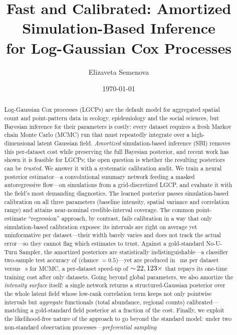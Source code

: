 \documentclass[11pt]{article}
\title{\bfseries Fast and Calibrated: Amortized Simulation-Based Inference\\
for Log-Gaussian Cox Processes}
\author[ ]{Elizaveta Semenova}
\affil[ ]{\small Department of Epidemiology and Biostatistics, Imperial College London}
\date{\today}
\begin{document}
\maketitle

\begin{abstract}
\noindent
Log-Gaussian Cox processes (LGCPs) are the default model for aggregated spatial
count and point-pattern data in ecology, epidemiology and the social sciences,
but Bayesian inference for their parameters is costly: every dataset requires a
fresh Markov chain Monte Carlo (MCMC) run that must repeatedly integrate over a
high-dimensional latent Gaussian field. \emph{Amortized} simulation-based
inference (SBI) removes this per-dataset cost while preserving the full Bayesian
posterior, and recent work has shown it is feasible for LGCPs; the open question
is whether the resulting posteriors can be \emph{trusted}. We answer it with a
systematic calibration audit. We train a neural posterior estimator---a
convolutional summary network feeding a masked autoregressive flow---on
simulations from a grid-discretized LGCP, and evaluate it with the field's most
demanding diagnostics. The learned posterior passes simulation-based calibration
on all three parameters (baseline intensity, spatial variance and correlation
range) and attains near-nominal credible-interval coverage. The common
point-estimate ``regression'' approach, by contrast, fails calibration in a way
that only simulation-based calibration exposes: its intervals are right on
average yet uninformative per dataset---their width barely varies and does not
track the actual error---so they cannot flag which estimates to trust. Against a
gold-standard No-U-Turn Sampler, the amortized posteriors are statistically
indistinguishable---a classifier two-sample test accuracy of \CtstMean{} (chance
$=0.5$)---yet are produced in \NpeMs{}~ms per dataset versus \McmcSec{}~s for
MCMC, a per-dataset speed-up of $\sim\!22,123\times$ that repays its one-time
training cost after only \BreakEven{} datasets. Going beyond global parameters,
we also amortize the \emph{intensity surface} itself: a single network returns a
structured-Gaussian posterior over the whole latent field whose low-rank
correlation term keeps not only pointwise intervals but \emph{aggregate}
functionals (total abundance, regional counts) calibrated---matching a
gold-standard field posterior at a fraction of the cost. Finally, we exploit the
likelihood-free nature of the approach to go beyond the standard model:
under two non-standard observation processes---\emph{preferential sampling}

\end{abstract}
\end{document}
